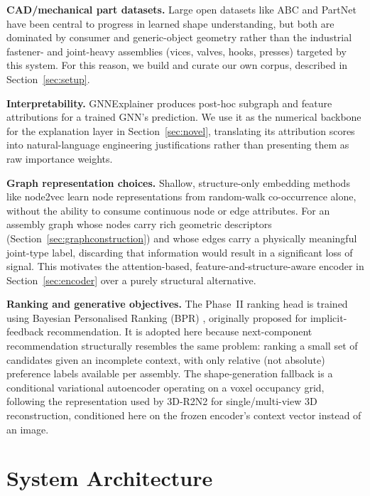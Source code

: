 \documentclass[sn-mathphys,Numbered]{sn-jnl}
\begin{document}
\textbf{CAD/mechanical part datasets.} Large open datasets like ABC \cite{koch2019abc} and PartNet \cite{mo2019partnet} have been central to progress in learned shape understanding, but both are dominated by consumer and generic-object geometry rather than the industrial fastener- and joint-heavy assemblies (vices, valves, hooks, presses) targeted by this system. For this reason, we build and curate our own corpus, described in Section~\ref{sec:setup}.

\textbf{Interpretability.} GNNExplainer \cite{ying2019gnnexplainer} produces post-hoc subgraph and feature attributions for a trained GNN's prediction. We use it as the numerical backbone for the explanation layer in Section~\ref{sec:novel}, translating its attribution scores into natural-language engineering justifications rather than presenting them as raw importance weights.

\textbf{Graph representation choices.} Shallow, structure-only embedding methods like node2vec \cite{grover2016node2vec} learn node representations from random-walk co-occurrence alone, without the ability to consume continuous node or edge attributes. For an assembly graph whose nodes carry rich geometric descriptors (Section~\ref{sec:graphconstruction}) and whose edges carry a physically meaningful joint-type label, discarding that information would result in a significant loss of signal. This motivates the attention-based, feature-and-structure-aware encoder in Section~\ref{sec:encoder} over a purely structural alternative.

\textbf{Ranking and generative objectives.} The Phase~II ranking head is trained using Bayesian Personalised Ranking (BPR) \cite{rendle2009bpr}, originally proposed for implicit-feedback recommendation. It is adopted here because next-component recommendation structurally resembles the same problem: ranking a small set of candidates given an incomplete context, with only relative (not absolute) preference labels available per assembly. The shape-generation fallback is a conditional variational autoencoder \cite{kingma2014vae} operating on a voxel occupancy grid, following the representation used by 3D-R2N2 \cite{choy2016occupancy} for single/multi-view 3D reconstruction, conditioned here on the frozen encoder's context vector instead of an image.

\section{System Architecture}\label{sec:arch}
\end{document}
